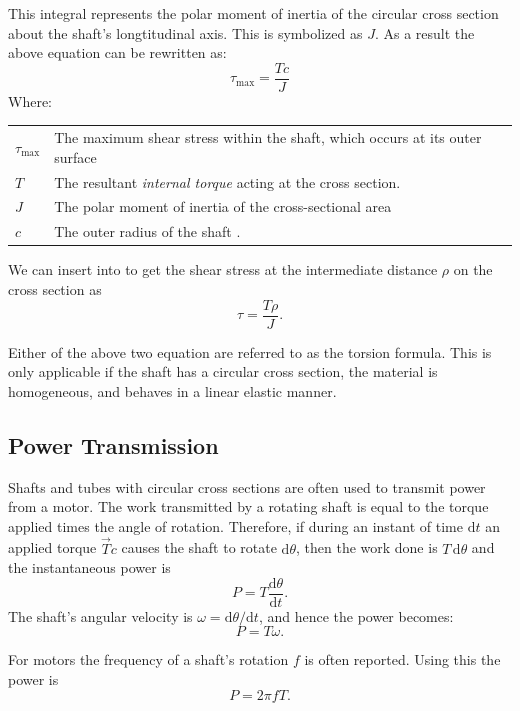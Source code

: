 This integral represents the polar moment of inertia of the circular cross section about the shaft's longtitudinal axis.
This is symbolized as $J$.
As a result the above equation can be rewritten as:
\begin{equation} \label{eq:106}
  \tau_{\mathrm{max}} = \frac{Tc}{J}
\end{equation}
Where:
\begin{center}
   \begin{tabular}{ll}
      $\tau_{\mathrm{max}}$  & The maximum shear stress within the shaft, which occurs at its outer surface \\
      $T$ & The resultant \textit{internal torque} acting at the cross section. \\
      $J$ & The polar moment of inertia of the cross-sectional area \\
      $c$ & The outer radius of the shaft
  .\end{tabular}
\end{center}

We can insert  into  to get the shear stress at the intermediate distance $\rho$ on the cross section as
\[ 
\tau = \frac{T \rho}{J}
.\]

Either of the above two equation are referred to as the torsion formula.
This is only applicable if the shaft has a circular cross section, the material is homogeneous, and behaves in a linear elastic manner.


\subsection{Power Transmission}
Shafts and tubes with circular cross sections are often used to transmit power from a motor.
The work transmitted by a rotating shaft is equal to the torque applied times the angle of rotation.
Therefore, if during an instant of time $\mathrm{d}t$ an applied torque $\Vec{T}c$ causes the shaft to rotate $\mathrm{d}\theta$, then the work done is $T \, \mathrm{d}\theta$ and the instantaneous power is
\[ 
P = T \frac{\mathrm{d}\theta}{\mathrm{d}t} 
.\]
The shaft's angular velocity is $\omega = \mathrm{d}\theta / \mathrm{d}t$, and hence the power becomes:
\[ 
P = T \omega
.\]

For motors the frequency of a shaft's rotation $f$ is often reported.
Using this the power is
\[ 
P = 2 \pi f T
.\]
